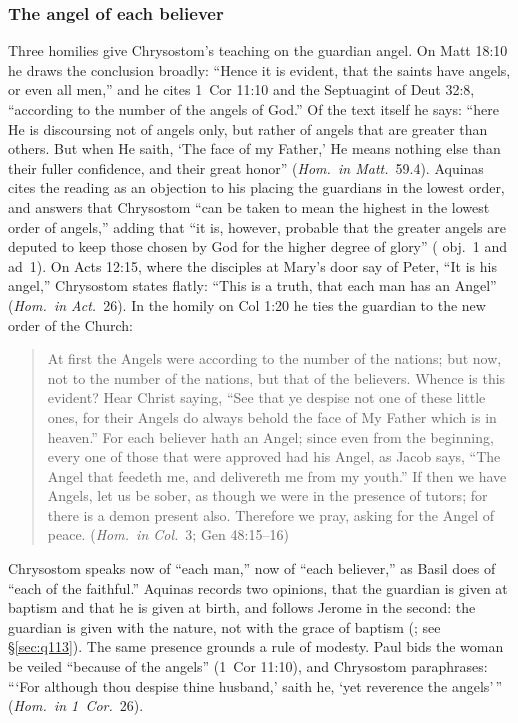 \subsubsection{The angel of each believer}

Three homilies give Chrysostom's teaching on the guardian angel. On Matt
18:10 he draws the conclusion broadly: ``Hence it is evident, that the
saints have angels, or even all men,'' and he cites 1~Cor 11:10 and the
Septuagint of Deut 32:8, ``according to the number of the angels of God.''
Of the text itself he says: ``here He is discoursing not of angels only,
but rather of angels that are greater than others. But when He saith,
`The face of my Father,' He means nothing else than their fuller
confidence, and their great honor'' (\emph{Hom.\ in Matt.}\ 59.4). Aquinas
cites the reading as an objection to his placing the guardians in the
lowest order, and answers that Chrysostom ``can be taken to mean the
highest in the lowest order of angels,'' adding that ``it is, however,
probable that the greater angels are deputed to keep those chosen by God
for the higher degree of glory'' ( obj.~1 and ad~1). On
Acts 12:15, where the disciples at Mary's door say of Peter, ``It is his
angel,'' Chrysostom states flatly: ``This is a truth, that each man has an
Angel'' (\emph{Hom.\ in Act.}\ 26). In the homily on Col 1:20 he ties the
guardian to the new order of the Church:

\begin{quote}
At first the Angels were according to the number of the nations; but now,
not to the number of the nations, but that of the believers. Whence is
this evident? Hear Christ saying, ``See that ye despise not one of these
little ones, for their Angels do always behold the face of My Father which
is in heaven.'' For each believer hath an Angel; since even from the
beginning, every one of those that were approved had his Angel, as Jacob
says, ``The Angel that feedeth me, and delivereth me from my youth.'' If
then we have Angels, let us be sober, as though we were in the presence of
tutors; for there is a demon present also. Therefore we pray, asking for
the Angel of peace. (\emph{Hom.\ in Col.}\ 3; Gen 48:15--16)
\end{quote}

\noindent Chrysostom speaks now of ``each man,'' now of ``each believer,''
as Basil does of ``each of the faithful.'' Aquinas records two opinions,
that the guardian is given at baptism and that he is given at birth, and
follows Jerome in the second: the guardian is given with the nature, not
with the grace of baptism (; see
\S\ref{sec:q113}). The same presence grounds a rule of modesty.
Paul bids the woman be veiled ``because of the angels'' (1~Cor 11:10), and
Chrysostom paraphrases: ```For although thou despise thine husband,' saith
he, `yet reverence the angels'\,'' (\emph{Hom.\ in 1~Cor.}\ 26).

